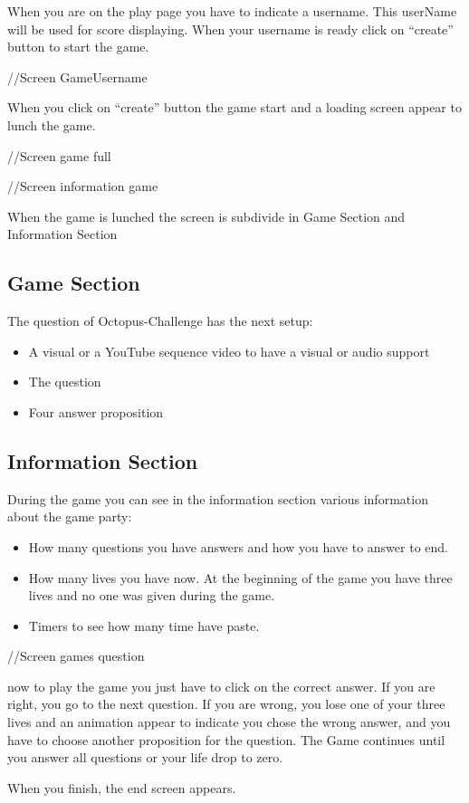 \documentclass[a4paper,11pt, oneside]{book}
\begin{document}
When you are on the play page you have to indicate a username.
This userName will be used for score displaying.
When your username is ready click on “create” button to start the game.

//Screen GameUsername

When you click on “create” button the game start and a loading screen appear to lunch the game.

//Screen game full


//Screen information game

When the game is lunched the screen is subdivide in Game Section and Information Section
\subsection{Game Section}
 The question of Octopus-Challenge has the next setup:
 	\begin{itemize}
		\item A visual or a YouTube sequence video to have a visual or audio support
		\item The question
		\item Four answer proposition
	\end{itemize}

\subsection{Information Section}
	During the game you can see in the information section various information about the game party:
	\begin{itemize}
	\item How many questions you have answers and how you have to answer to end.
	\item How many lives you have now. At the beginning of the game you have three lives and no one was given during the game.
	\item Timers to see how many time have paste.
	\end{itemize}


//Screen games question

now to play the game you just have to click on the correct answer.
If you are right, you go to the next question.
If you are wrong, you lose one of your three lives and an animation appear to indicate you chose the wrong answer, and you have to choose another proposition for the question.
The Game continues until you answer all questions or your life drop to zero.

When you finish, the end screen appears.
\end{document}
